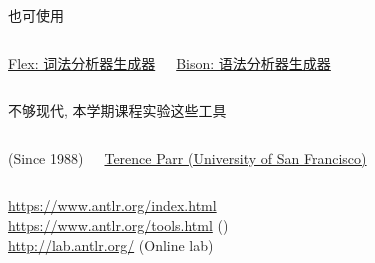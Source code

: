 

\begin{frame}{}
  \begin{center}
    也可使用
  \end{center}
\end{frame}

\begin{frame}{}
  \begin{columns}
    \begin{center}
      \href{https://en.wikipedia.org/wiki/Flex_(lexical_analyser_generator)}{\footnotesize Flex: 词法分析器生成器}
    \end{center}
    \begin{center}
      \href{https://en.wikipedia.org/wiki/GNU_Bison}{\footnotesize Bison: 语法分析器生成器}
    \end{center}
  \end{columns}

  \vspace{0.50cm}
  \begin{center}
    不够现代, 本学期课程实验这些工具
  \end{center}
\end{frame}

\begin{frame}{}
  \begin{columns}
    \begin{center}
      (Since 1988)
    \end{center}
    \begin{center}
      \href{https://parrt.cs.usfca.edu/}{\small Terence Parr (University of San Francisco)}
    \end{center}
  \end{columns}

  \vspace{0.80cm}
  \begin{center}
    \url{https://www.antlr.org/index.html} \\[5pt]
    \url{https://www.antlr.org/tools.html} () \\[5pt]
    \url{http://lab.antlr.org/} (Online lab)
  \end{center}
\end{frame}

